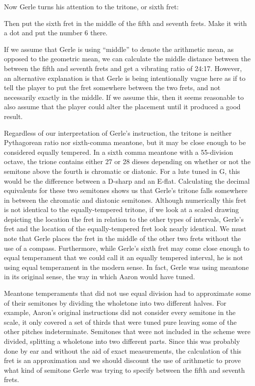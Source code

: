 Now Gerle turns his attention to the tritone, or sixth fret:
\begin{blocks}
Then put the sixth fret in the middle of the fifth and seventh frets.  Make it
with a dot and put the number 6 there.
\end{blocks}
If we assume that Gerle is using ``middle'' to denote the arithmetic mean, as opposed
to the geometric mean, we can calculate the middle distance between the between the
fifth and seventh frets and get a vibrating ratio of 24:17.  However, an alternative
explanation is that Gerle is being intentionally vague here as if to tell the player to
put the fret somewhere between the two frets, and not necessarily exactly in the
middle.  If we assume this, then it seems reasonable to also assume that the player
could alter the placement until it produced a good result.

Regardless of our interpretation of Gerle's instruction, the tritone is neither
Pythagorean ratio nor sixth-comma meantone, but it may be close enough to be considered
equally tempered. In a sixth comma meantone with a 55-division octave, the trione
contains either 27 or 28 dieses depending on whether or not the semitone above the
fourth is chromatic or diatonic.  For a lute tuned in G, this would be the difference
between a D-sharp and an E-flat. Calculating the decimal equivalents for these two
semitones shows us that Gerle's tritone falls somewhere in between the chromatic and
diatonic semitones.  Although numerically this fret is not identical to the
equally-tempered tritone, if we look at a scaled drawing depicting the location the
fret in relation to the other types of intervals, Gerle's fret and the location of the
equally-tempered fret look nearly identical. We must note that Gerle places the fret in
the middle of the other two frets without the use of a compass.  Furthermore, while
Gerle's sixth fret may come close enough to equal temperament that we could call it an
equally tempered interval, he is not using equal temperament in the modern sense.  In
fact, Gerle was using meantone in its original sense, the way in which Aaron would have
tuned.

Meantone temperaments that did not use equal division had to approximate some of their
semitones by dividing the wholetone into two different halves. For example, Aaron's
original instructions did not consider every semitone in the scale, it only covered a
set of thirds that were tuned pure leaving some of the other pitches indeterminate.
Semitones that were not included in the scheme were divided, splitting a wholetone into
two different parts. Since this was probably done by ear and without the aid of exact
measurements, the calculation of this fret is an approximation and we should discount
the use of arithmetic to prove what kind of semitone Gerle was trying to specify
between the fifth and seventh frets.


